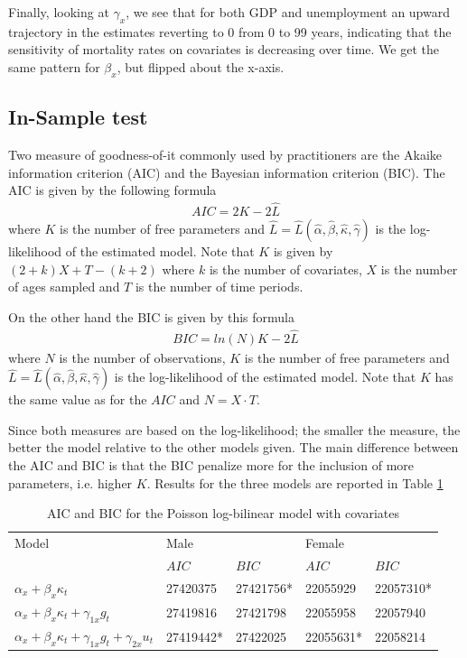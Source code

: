 \documentclass[AER, draftmode]{AEA}
\begin{document}
Finally, looking at $\gamma_x$, we see that for both GDP and unemployment an upward trajectory in the estimates reverting to 0 from 0 to 99 years, indicating that the sensitivity of mortality rates on covariates is decreasing over time. We get the same pattern for $\beta_x$, but flipped about the x-axis.


\subsection{In-Sample test}

Two measure of goodness-of-it commonly used by practitioners are the Akaike information criterion (AIC) and the Bayesian information criterion (BIC). The AIC is given by the following formula
\begin{align}
AIC = 2 K - 2 \hat{L}
\end{align}
where $K$ is the number of free parameters and $\hat{L}=\hat{L}(\hat{\alpha}, \hat{\beta}, \hat{\kappa}, \hat{\gamma})$ is the log-likelihood of the estimated model. Note that $K$ is given by $(2+k)X + T - (k+2)$ where $k$ is the number of covariates, $X$ is the number of ages sampled and $T$ is the number of time periods.

On the other hand the BIC is given by this formula
\begin{align}
	BIC = ln(N) K - 2 \hat{L}
\end{align}
where $N$ is the number of observations, $K$ is the number of free parameters and $\hat{L}=\hat{L}(\hat{\alpha}, \hat{\beta}, \hat{\kappa}, \hat{\gamma})$ is the log-likelihood of the estimated model. Note that $K$ has the same value as for the $AIC$ and $N=X\cdot T$. 

Since both measures are based on the log-likelihood; the smaller the measure, the better the model relative to the other models given. The main difference between the AIC and BIC is that the BIC penalize more for the inclusion of more parameters, i.e. higher $K$. Results for the three models are reported in Table \ref{tab:aic}

\begin{table}[!htp]
	\centering
	\caption{AIC and BIC for the Poisson log-bilinear model with covariates}
	\label{tab:aic}
	\begin{tabular}{lllll}
		\hline
		Model                                                              & \multicolumn{2}{l}{Male} & \multicolumn{2}{l}{Female} \\ \cline{2-5} 
		& $AIC$      & $BIC$      & $AIC$       & $BIC$       \\ \hline
		$\alpha_x + \beta_x \kappa_t$                                      & 27420375   & 27421756*   & 22055929    & 22057310*    \\
		$\alpha_x + \beta_x \kappa_t + \gamma_{1x} g_t$                    & 27419816   & 27421798   & 22055958    & 22057940    \\
		$ \alpha_x + \beta_x \kappa_t + \gamma_{1x} g_t + \gamma_{2x} u_t$ & 27419442*   & 27422025   & 22055631*    & 22058214    \\ \hline
	\end{tabular}
\end{table}
\end{document}
